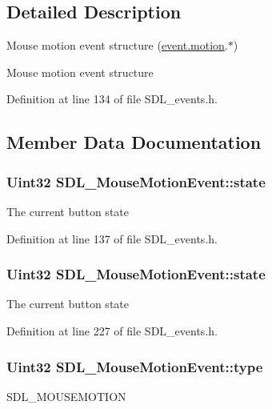 \subsection{Detailed Description}
Mouse motion event structure (\hyperlink{unionSDL__Event_ac3c89e190faacbe84280cd539453bab6}{event.\+motion}.$\ast$) 

Mouse motion event structure 

Definition at line 134 of file S\+D\+L\+\_\+events.\+h.



\subsection{Member Data Documentation}
\hypertarget{structSDL__MouseMotionEvent_a3f6e9bad9d959b824881ba09e05b7024}{
\subsubsection[{state}]{\setlength{\rightskip}{0pt plus 5cm}Uint32 S\+D\+L\+\_\+\+Mouse\+Motion\+Event\+::state}}\label{structSDL__MouseMotionEvent_a3f6e9bad9d959b824881ba09e05b7024}
The current button state 

Definition at line 137 of file S\+D\+L\+\_\+events.\+h.

\hypertarget{structSDL__MouseMotionEvent_a3f6e9bad9d959b824881ba09e05b7024}{
\subsubsection[{state}]{\setlength{\rightskip}{0pt plus 5cm}Uint32 S\+D\+L\+\_\+\+Mouse\+Motion\+Event\+::state}}\label{structSDL__MouseMotionEvent_a3f6e9bad9d959b824881ba09e05b7024}
The current button state 

Definition at line 227 of file S\+D\+L\+\_\+events.\+h.

\hypertarget{structSDL__MouseMotionEvent_a431dd28cd6db6a7335cf633dbeb80cfb}{
\subsubsection[{type}]{\setlength{\rightskip}{0pt plus 5cm}Uint32 S\+D\+L\+\_\+\+Mouse\+Motion\+Event\+::type}}\label{structSDL__MouseMotionEvent_a431dd28cd6db6a7335cf633dbeb80cfb}
S\+D\+L\+\_\+\+M\+O\+U\+S\+E\+M\+O\+T\+I\+O\+N

